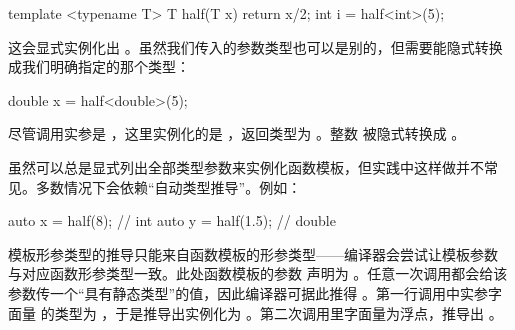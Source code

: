 \begin{code}
template <typename T> T half(T x) { return x/2; }
int i = half<int>(5);
\end{code}

这会显式实例化出 。虽然我们传入的参数类型也可以是别的，但需要能隐式转换成我们明确指定的那个类型：

\begin{code}
double x = half<double>(5);
\end{code}

尽管调用实参是 ，这里实例化的是 ，返回类型为 。整数  被隐式转换成 。

虽然可以总是显式列出全部类型参数来实例化函数模板，但实践中这样做并不常见。多数情况下会依赖“自动类型推导”。例如：

\begin{code}
auto x = half(8);    // int
auto y = half(1.5);    // double
\end{code}

模板形参类型的推导只能来自函数模板的形参类型——编译器会尝试让模板参数  与对应函数形参类型一致。此处函数模板的参数  声明为 。任意一次调用都会给该参数传一个“具有静态类型”的值，因此编译器可据此推得 。第一行调用中实参字面量  的类型为 ，于是推导出实例化为 。第二次调用里字面量为浮点，推导出 。

